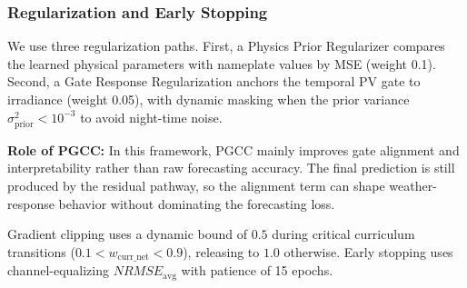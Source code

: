 \subsubsection{Regularization and Early Stopping}
We use three regularization paths. First, a Physics Prior Regularizer compares the learned physical parameters with nameplate values by MSE (weight 0.1). Second, a Gate Response Regularization anchors the temporal PV gate to irradiance (weight 0.05), with dynamic masking when the prior variance $\sigma^2_{\text{prior}} < 10^{-3}$ to avoid night-time noise.

\textbf{Role of PGCC:} In this framework, PGCC mainly improves gate alignment and interpretability rather than raw forecasting accuracy. The final prediction is still produced by the residual pathway, so the alignment term can shape weather-response behavior without dominating the forecasting loss.

Gradient clipping uses a dynamic bound of $0.5$ during critical curriculum transitions ($0.1 < w_{\text{curr\_net}} < 0.9$), releasing to $1.0$ otherwise. Early stopping uses channel-equalizing $NRMSE_{\text{avg}}$ with patience of 15 epochs.
